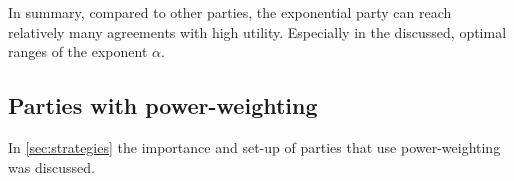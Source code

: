             In summary, compared to other parties, the exponential party can reach relatively many agreements with high utility. Especially in the discussed, optimal ranges of the exponent $\alpha$.

          
            

    


        \subsection{Parties with power-weighting}
        In \autoref{sec:strategies} the importance and set-up of parties that use power-weighting was discussed. 

